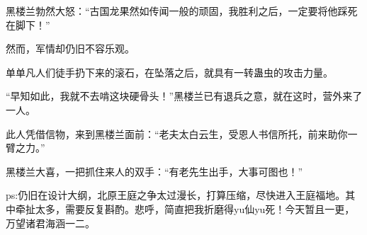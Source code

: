 \begin{this_body}
黑楼兰勃然大怒：“古国龙果然如传闻一般的顽固，我胜利之后，一定要将他踩死在脚下！”

然而，军情却仍旧不容乐观。

单单凡人们徒手扔下来的滚石，在坠落之后，就具有一转蛊虫的攻击力量。

“早知如此，我就不去啃这块硬骨头！”黑楼兰已有退兵之意，就在这时，营外来了一人。

此人凭借信物，来到黑楼兰面前：“老夫太白云生，受恩人书信所托，前来助你一臂之力。”

黑楼兰大喜，一把抓住来人的双手：“有老先生出手，大事可图也！”

ps:仍旧在设计大纲，北原王庭之争太过漫长，打算压缩，尽快进入王庭福地。其中牵扯太多，需要反复斟酌。悲呼，简直把我折磨得yu仙yu死！今天暂且一更，万望诸君海涵一二。

\end{this_body}

